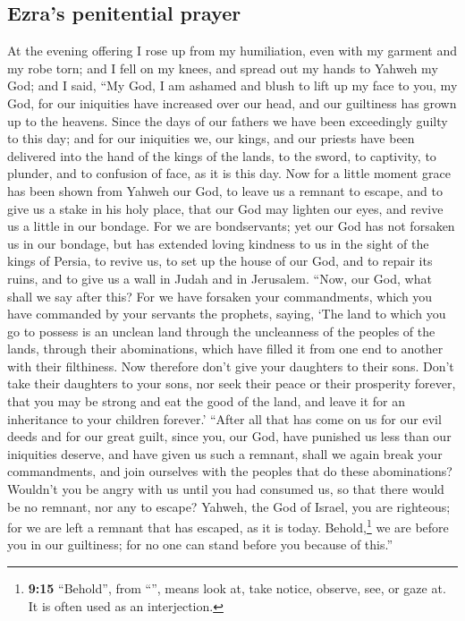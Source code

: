 \hypertarget{ezras-penitential-prayer}{%
\subsection{Ezra's penitential prayer}\label{ezras-penitential-prayer}}

 At the evening offering I rose up from my humiliation,
even with my garment and my robe torn; and I fell on my knees, and
spread out my hands to Yahweh my God;  and I said, ``My
God, I am ashamed and blush to lift up my face to you, my God, for our
iniquities have increased over our head, and our guiltiness has grown up
to the heavens.  Since the days of our fathers we have
been exceedingly guilty to this day; and for our iniquities we, our
kings, and our priests have been delivered into the hand of the kings of
the lands, to the sword, to captivity, to plunder, and to confusion of
face, as it is this day.  Now for a little moment grace
has been shown from Yahweh our God, to leave us a remnant to escape, and
to give us a stake in his holy place, that our God may lighten our eyes,
and revive us a little in our bondage.  For we are
bondservants; yet our God has not forsaken us in our bondage, but has
extended loving kindness to us in the sight of the kings of Persia, to
revive us, to set up the house of our God, and to repair its ruins, and
to give us a wall in Judah and in Jerusalem.  ``Now, our
God, what shall we say after this? For we have forsaken your
commandments,  which you have commanded by your servants
the prophets, saying, `The land to which you go to possess is an unclean
land through the uncleanness of the peoples of the lands, through their
abominations, which have filled it from one end to another with their
filthiness.  Now therefore don't give your daughters to
their sons. Don't take their daughters to your sons, nor seek their
peace or their prosperity forever, that you may be strong and eat the
good of the land, and leave it for an inheritance to your children
forever.'  ``After all that has come on us for our evil
deeds and for our great guilt, since you, our God, have punished us less
than our iniquities deserve, and have given us such a remnant,
 shall we again break your commandments, and join
ourselves with the peoples that do these abominations? Wouldn't you be
angry with us until you had consumed us, so that there would be no
remnant, nor any to escape?  Yahweh, the God of Israel,
you are righteous; for we are left a remnant that has escaped, as it is
today. Behold,\footnote{\textbf{9:15} ``Behold'', from ``'',
  means look at, take notice, observe, see, or gaze at. It is often used
  as an interjection.} we are before you in our guiltiness; for no one
can stand before you because of this.''

